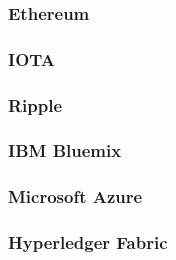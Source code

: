 \subsubsection{Ethereum}


\subsubsection{IOTA}


\subsubsection{Ripple}


\subsubsection{IBM Bluemix}


\subsubsection{Microsoft Azure}


\subsubsection{Hyperledger Fabric}


\newpage
